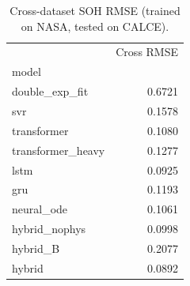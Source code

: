 \begin{table}
\caption{Cross-dataset SOH RMSE (trained on NASA, tested on CALCE).}
\label{tab:cross_dataset_rmse}
\begin{tabular}{lr}
\toprule
 & Cross RMSE \\
model &  \\
\midrule
double\_exp\_fit & 0.6721 \\
svr & 0.1578 \\
transformer & 0.1080 \\
transformer\_heavy & 0.1277 \\
lstm & 0.0925 \\
gru & 0.1193 \\
neural\_ode & 0.1061 \\
hybrid\_nophys & 0.0998 \\
hybrid\_B & 0.2077 \\
hybrid & 0.0892 \\
\bottomrule
\end{tabular}
\end{table}
